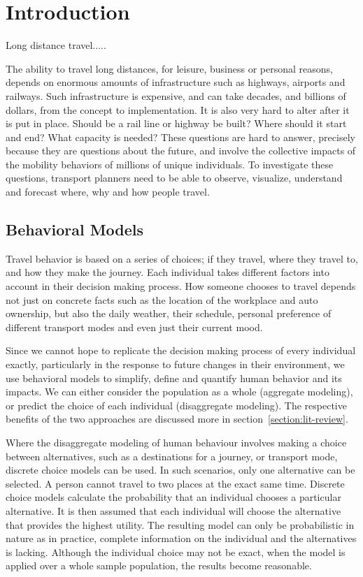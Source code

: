 \chapter{Introduction}
Long distance travel.....


The ability to travel long distances, for leisure, business or personal reasons, depends on enormous amounts of infrastructure such as highways, airports and railways. Such infrastructure is expensive, and can take decades, and billions of dollars, from the concept to implementation. It is also very hard to alter after it is put in place. Should be a rail line or highway be built? Where should it start and end? What capacity is needed? These questions are hard to answer, precisely because they are questions about the future, and involve the collective impacts of the mobility behaviors of millions of unique individuals. To investigate these questions, transport planners need to be able to observe, visualize, understand and forecast where, why and how people travel. 
	

\section{Behavioral Models}
Travel behavior is based on a series of choices; if they travel, where they travel to, and how they make the journey. Each individual takes different factors into account in their decision making process. How someone chooses to travel depends not just on concrete facts such as the location of the workplace and auto ownership, but also the daily weather, their schedule, personal preference of different transport modes and even just their current mood.

Since we cannot hope to replicate the decision making process of every individual exactly, particularly in the response to future changes in their environment,  we use behavioral models to simplify, define and quantify human behavior and its impacts. We can either consider the population as a whole (aggregate modeling), or predict the choice of each individual (disaggregate modeling). The respective benefits of the two approaches are discussed more in section~\ref{section:lit-review}.

Where the disaggregate modeling of human behaviour involves making a choice between alternatives, such as a destinations for a journey, or transport mode, discrete choice models can be used. In such scenarios, only one alternative can be selected. A person cannot travel to two places at the exact same time. Discrete choice models calculate the probability that an individual chooses a particular alternative. It is then assumed that each individual will choose the alternative that provides the highest utility. The resulting model can only be probabilistic in nature as in practice, complete information on the individual and the alternatives is lacking. Although the individual choice may not be exact, when the model is applied  over a whole sample population, the results become reasonable.  

